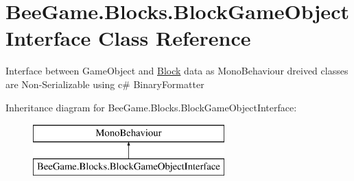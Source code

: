 \hypertarget{class_bee_game_1_1_blocks_1_1_block_game_object_interface}{}\section{Bee\+Game.\+Blocks.\+Block\+Game\+Object\+Interface Class Reference}
\label{class_bee_game_1_1_blocks_1_1_block_game_object_interface}


Interface between Game\+Object and \hyperlink{class_bee_game_1_1_blocks_1_1_block}{Block} data as Mono\+Behaviour dreived classes are Non-\/\+Serializable using c\# Binary\+Formatter  


Inheritance diagram for Bee\+Game.\+Blocks.\+Block\+Game\+Object\+Interface\+:\begin{figure}[H]
\begin{center}
\leavevmode
\includegraphics[height=2.000000cm]{class_bee_game_1_1_blocks_1_1_block_game_object_interface}
\end{center}
\end{figure}
